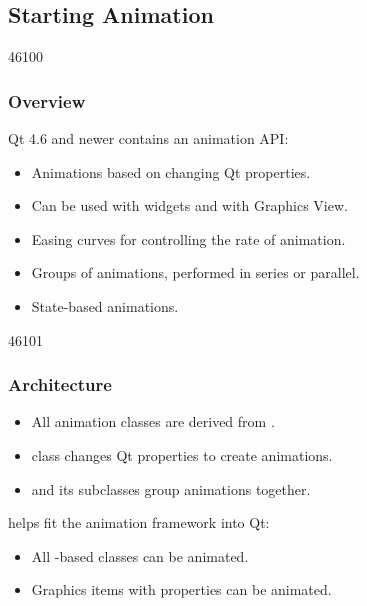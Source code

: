 %
%
%
%

\subsection{Starting Animation}

\begin{slide}{46100}\frametitle{Overview}
\label{animations}
\vspace*{1.5em}
Qt 4.6 and newer contains an animation API:
\begin{itemize}
\item Animations based on changing Qt properties.
\item Can be used with widgets and with Graphics View.
\item Easing curves for controlling the rate of animation.
\item Groups of animations, performed in series or parallel.
\item State-based animations.
\end{itemize}
\end{slide}


\begin{slide}{46101}\frametitle{Architecture}
\vspace*{1.5em}
\begin{itemize}
\item All animation classes are derived from .
\item {} class changes Qt properties to create animations.
\item {} and its subclasses group animations together.
\end{itemize}

 helps fit the animation framework into Qt:
\begin{itemize}
\item All -based classes can be animated.
\item Graphics items with properties can be animated.
\end{itemize}

\end{slide}

